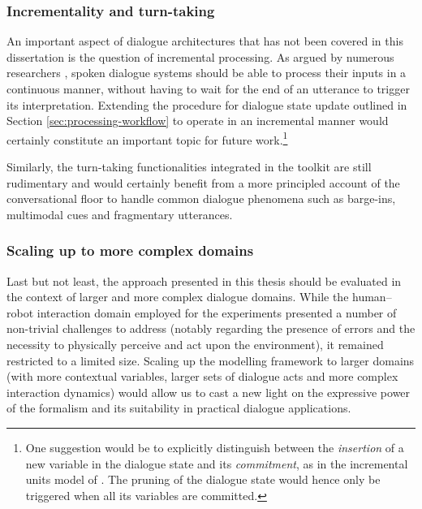 \subsubsection*{Incrementality and turn-taking}

An important aspect of dialogue architectures that has not been covered in this dissertation is the question of incremental processing. As argued by numerous researchers \citep[see e.g.\ ][]{schlangen2009general}, spoken dialogue systems should be able to process their inputs in a continuous manner, without having to wait for the end of an utterance to trigger its interpretation.  Extending the procedure for dialogue state update outlined in Section \ref{sec:processing-workflow} to operate in an incremental manner would certainly constitute an important topic for future work.\footnote{One suggestion would be to explicitly distinguish between the \textit{insertion} of a new variable in the dialogue state and its \textit{commitment}, as in the incremental units model of \cite{schlangen2009general}.  The pruning of the dialogue state would hence only be triggered when all its variables are committed.}

Similarly, the turn-taking functionalities integrated in the \opendial{} toolkit are still rudimentary and would certainly benefit from a more principled account of the conversational floor to handle common dialogue phenomena such as barge-ins, multimodal cues and fragmentary utterances. 

\subsubsection*{Scaling up to more complex domains}

Last but not least, the approach presented in this thesis should be evaluated in the context of larger and more complex dialogue domains. While the human--robot interaction domain employed for the experiments presented a number of non-trivial challenges to address (notably regarding the presence of errors and the necessity to physically perceive and act upon the environment), it remained restricted to a limited size. Scaling up the modelling framework to larger domains (with more contextual variables, larger sets of dialogue acts and more complex interaction dynamics) would allow us to cast a new light on the expressive power of the formalism and its suitability in practical dialogue applications. 

